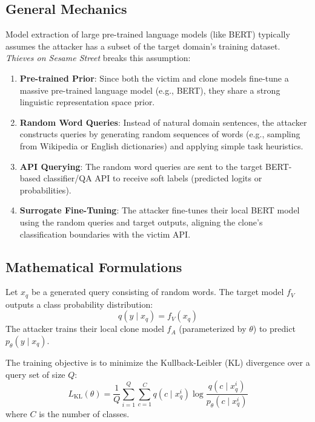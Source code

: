 \documentclass{article}
\begin{document}
\subsection{General Mechanics}
Model extraction of large pre-trained language models (like BERT) typically assumes the attacker has a subset of the target domain's training dataset. \textit{Thieves on Sesame Street} breaks this assumption:
\begin{enumerate}
    \item \textbf{Pre-trained Prior}: Since both the victim and clone models fine-tune a massive pre-trained language model (e.g., BERT), they share a strong linguistic representation space prior.
    \item \textbf{Random Word Queries}: Instead of natural domain sentences, the attacker constructs queries by generating random sequences of words (e.g., sampling from Wikipedia or English dictionaries) and applying simple task heuristics.
    \item \textbf{API Querying}: The random word queries are sent to the target BERT-based classifier/QA API to receive soft labels (predicted logits or probabilities).
    \item \textbf{Surrogate Fine-Tuning}: The attacker fine-tunes their local BERT model using the random queries and target outputs, aligning the clone's classification boundaries with the victim API.
\end{enumerate}

\subsection{Mathematical Formulations}
Let $x_q$ be a generated query consisting of random words. The target model $f_V$ outputs a class probability distribution:
$$q(y \mid x_q) = f_V(x_q)$$
The attacker trains their local clone model $f_A$ (parameterized by $\theta$) to predict $p_{\theta}(y \mid x_q)$. 

The training objective is to minimize the Kullback-Leibler (KL) divergence over a query set of size $Q$:
\begin{equation}
    L_{\text{KL}}(\theta) = \frac{1}{Q} \sum_{i=1}^Q \sum_{c=1}^C q(c \mid x_q^i) \log \frac{q(c \mid x_q^i)}{p_{\theta}(c \mid x_q^i)}
\end{equation}
where $C$ is the number of classes.
\end{document}
